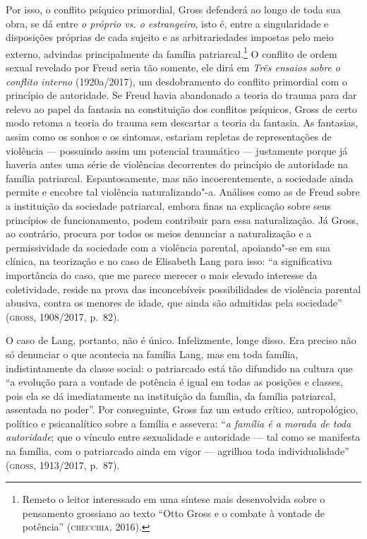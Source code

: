 Por isso, o conflito psíquico primordial, Gross defenderá ao longo de
toda sua obra, se dá entre \emph{o próprio vs. o estrangeiro}, isto é,
entre a singularidade e disposições próprias de cada sujeito e as
arbitrariedades impostas pelo meio externo, advindas principalmente da
família patriarcal.\footnote{Remeto o leitor interessado em uma síntese
  mais desenvolvida sobre o pensamento grossiano ao texto ``Otto Gross e
  o combate à vontade de potência'' (\textsc{checchia}, 2016).} O conflito de ordem sexual
revelado por Freud seria tão somente, ele dirá em \emph{Três ensaios
sobre o conflito interno} (1920a/2017), um desdobramento do conflito primordial com
o princípio de autoridade. Se Freud havia abandonado a teoria do trauma
para dar relevo ao papel da fantasia na constituição dos conflitos
psíquicos, Gross de certo modo retoma a teoria do trauma sem descartar a
teoria da fantasia. As fantasias, assim como os sonhos e os sintomas,
estariam repletas de representações de violência --- possuindo assim um
potencial traumático --- justamente porque já haveria antes uma série de
violências decorrentes do princípio de autoridade na família patriarcal.
Espantosamente, mas não incoerentemente, a sociedade ainda permite e
encobre tal violência naturalizando"-a. Análises como as de Freud sobre a
instituição da sociedade patriarcal, embora finas na explicação sobre
seus princípios de funcionamento, podem contribuir para essa
naturalização. Já Gross, ao contrário, procura por todos os meios
denunciar a naturalização e a permissividade da sociedade com a
violência parental, apoiando"-se em sua clínica, na teorização e no caso
de Elisabeth Lang para isso: ``a significativa importância do caso, que
me parece merecer o mais elevado interesse da coletividade, reside na
prova das inconcebíveis possibilidades de violência parental abusiva,
contra os menores de idade, que ainda são admitidas pela sociedade'' (\textsc{gross}, 1908/2017, p.~82).

O caso de Lang, portanto, não é único. Infelizmente, longe disso. Era
preciso não só denunciar o que acontecia na família Lang, mas em toda
família, indistintamente da classe social: o patriarcado está tão
difundido na cultura que ``a evolução para a vontade de potência é igual
em todas as posições e classes, pois ela se dá imediatamente na
instituição da família, da família patriarcal, assentada no poder''.
Por conseguinte, Gross faz um estudo crítico, antropológico, político e
psicanalítico sobre a família e assevera: ``\emph{a família é a morada
de toda autoridade}; que o vínculo entre sexualidade e autoridade ---
tal como se manifesta na família, com o patriarcado ainda em vigor ---
agrilhoa toda individualidade'' (\textsc{gross}, 1913/2017, p.~87).

